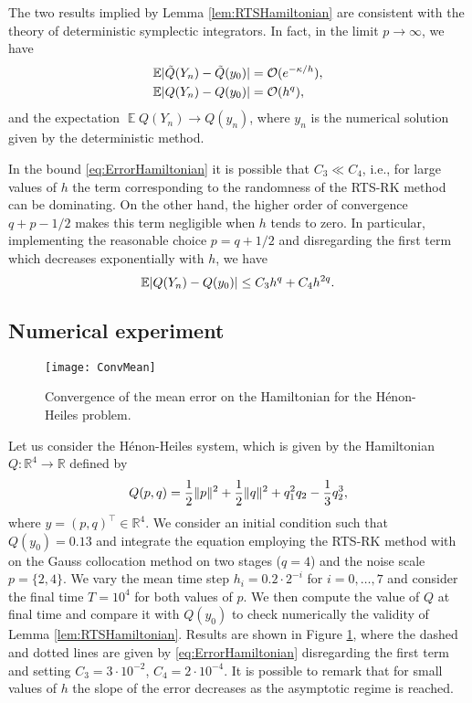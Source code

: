 \documentclass{siamart1116}
\numberwithin{theorem}{section}
\DeclarePairedDelimiter{\abs}{\lvert}{\rvert}
\DeclarePairedDelimiter{\norm}{\|}{\|}
\newcommand{\R}{\mathbb{R}}
\newcommand{\OO}{\mathcal{O}}
\newcommand{\E}{\operatorname{\mathbb{E}}}
\begin{document}
\begin{remark} The two results implied by Lemma \ref{lem:RTSHamiltonian} are consistent with the theory of deterministic symplectic integrators. In fact, in the limit $p \to \infty$, we have
	\begin{align}
		\E \abs{\tilde Q(Y_n) - \tilde Q(y_0)} &= \OO(e^{-\kappa/h}), \\
		\E \abs{Q(Y_n) - Q(y_0)} &= \OO(h^q),
	\end{align}
	and the expectation $\E Q(Y_n) \to Q(y_n)$, where $y_n$ is the numerical solution given by the deterministic method.
\end{remark}
\begin{remark} In the bound \eqref{eq:ErrorHamiltonian} it is possible that $C_3 \ll C_4$, i.e., for large values of $h$ the term corresponding to the randomness of the RTS-RK method can be dominating. On the other hand, the higher order of convergence $q + p - 1/2$ makes this term negligible when $h$ tends to zero. In particular, implementing the reasonable choice $p = q + 1/2$ and disregarding the first term which decreases exponentially with $h$, we have
\begin{equation}
	\E\abs{Q(Y_n) - Q(y_0)} \leq C_3 h^q + C_4h^{2q}.
\end{equation} 
\end{remark}

\subsection{Numerical experiment} 
\begin{figure}[t!]
	\centering
	\texttt{[image: ConvMean]}
	\caption{Convergence of the mean error on the Hamiltonian for the Hénon-Heiles problem.}
	\label{fig:Mean}	
\end{figure}

Let us consider the Hénon-Heiles system, which is given by the Hamiltonian $Q \colon \R^4 \to \R$ defined by
\begin{equation}
	Q(p, q) = \frac{1}{2}\norm{p}^2 + \frac{1}{2}\norm{q}^2 + q_1^2q_2 - \frac{1}{3}q_2^3,
\end{equation}
where $y = (p, q)^\top \in \R^4$. We consider an initial condition such that $Q(y_0) = 0.13$ and integrate the equation employing the RTS-RK method with on the Gauss collocation method on two stages ($q = 4$) and the noise scale $p = \{2, 4\}$. We vary the mean time step $h_i = 0.2 \cdot 2^{-i}$ for $i = 0, \ldots, 7$ and consider the final time $T = 10^4$ for both values of $p$. We then compute the value of $Q$ at final time and compare it with $Q(y_0)$ to check numerically the validity of Lemma \ref{lem:RTSHamiltonian}. Results are shown in Figure \ref{fig:Mean}, where the dashed and dotted lines are given by \eqref{eq:ErrorHamiltonian} disregarding the first term and setting $C_3 = 3\cdot 10^{-2}$, $C_4 = 2\cdot 10^{-4}$. It is possible to remark that for small values of $h$ the slope of the error decreases as the asymptotic regime is reached.
\end{document}
